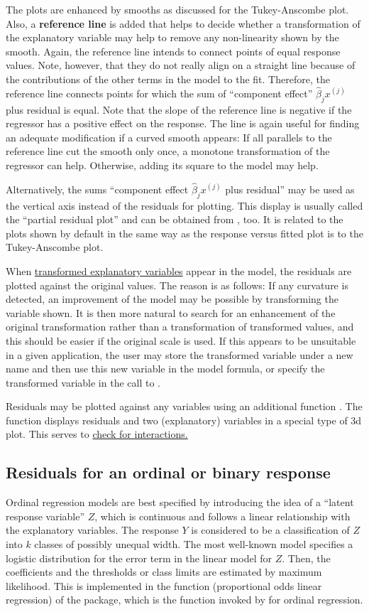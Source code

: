 \documentclass[11pt]{article}\usepackage[]{graphicx}\usepackage[]{color}
\begin{document}
The plots are enhanced by smooths as discussed for the Tukey-Anscombe
plot. 
Also, a \textbf{reference line} is added that helps to decide whether a
transformation of the explanatory variable may help to remove any
non-linearity shown by the smooth.
Again, the reference line intends to connect points of equal response
values. Note, however, that they do not really align on a straight line
because of the contributions of the other terms in the model to the fit.
Therefore, the reference line connects points for which the sum of 
``component effect'' $\widehat\beta_j x^{(j)}$ plus residual is equal.
Note that the slope of the reference line is negative if the regressor has
a positive effect on the response.
The line is again useful for finding an adequate modification if a curved
smooth appears: If all parallels to the reference line cut the smooth only
once, a monotone transformation of the regressor can help. 
Otherwise, adding its square to the model may help.

Alternatively, the sums 
``component effect $\widehat\beta_j x^{(j)}$ plus residual''
may be used as the vertical axis instead of the
residuals for plotting. This display is usually called the 
``partial residual plot'' and can be obtained from , too. 
It is related to the plots shown by default in the same way as the
response versus fitted plot is to the Tukey-Anscombe plot.

When \ul{transformed explanatory variables} appear in the model, the
residuals are plotted against the original values. The reason is as
follows: If any curvature is detected, an improvement of the model may be
possible by transforming the variable shown. It is then more natural
to search for an enhancement of the original transformation rather than 
a transformation of transformed values, and this should be easier if 
the original scale is used.
If this appears to be unsuitable in a given application, the user
may store the transformed variable under a new name and then use 
this new variable in the model formula, or specify the transformed 
variable in the call to .

Residuals may be plotted against any variables using an additional function 
. The function  displays residuals and two
(explanatory) variables in a special type of 3d plot. This serves to 
\ul{check for interactions.}

\subsection{Residuals for an ordinal or binary response}
Ordinal regression models are best specified by introducing the idea of a 
``latent response variable'' $Z$, which is continuous and follows a linear
relationship with the explanatory variables. 
The response $Y$ is considered to be a classification of $Z$ into $k$
classes of possibly unequal width. The most well-known model specifies a 
logistic distribution for the error term in the linear model for $Z$.
Then, the coefficients and the thresholds or class limits are estimated by
maximum likelihood. This is implemented in the function  
(proportional odds linear regression) of the  package, 
which is the function invoked by  for ordinal regression.
\end{document}
